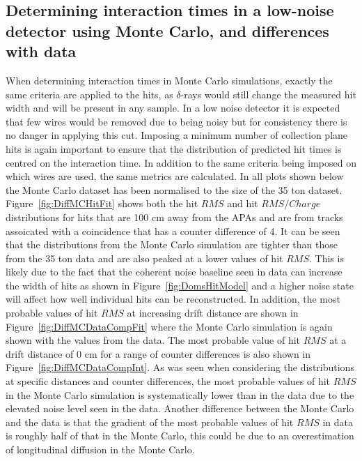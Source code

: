 \subsection{Determining interaction times in a low-noise detector using Monte Carlo, and differences with data} \label{sec:MCDataComp}
When determining interaction times in Monte Carlo simulations, exactly the same criteria are applied to the hits, as $\delta$-rays would still change the measured hit width and will be present in any sample. In a low noise detector it is expected that few wires would be removed due to being noisy but for consistency there is no danger in applying this cut. Imposing a minimum number of collection plane hits is again important to ensure that the distribution of predicted hit times is centred on the interaction time. In addition to the same criteria being imposed on which wires are used, the same metrics are calculated. In all plots shown below the Monte Carlo dataset has been normalised to the size of the 35 ton dataset. \\

Figure~\ref{fig:DiffMCHitFit} shows both the hit $RMS$ and hit $RMS/Charge$ distributions for hits that are 100 cm away from the APAs and are from tracks assoicated with a coincidence that has a counter difference of 4. It can be seen that the distributions from the Monte Carlo simulation are tighter than those from the 35 ton data and are also peaked at a lower values of hit $RMS$. This is likely due to the fact that the coherent noise baseline seen in data can increase the width of hits as shown in Figure~\ref{fig:DomsHitModel} and a higher noise state will affect how well individual hits can be reconstructed. In addition, the most probable values of hit $RMS$ at increasing drift distance are shown in Figure~\ref{fig:DiffMCDataCompFit} where the Monte Carlo simulation is again shown with the values from the data. The most probable value of hit $RMS$ at a drift distance of 0 cm for a range of counter differences is also shown in Figure~\ref{fig:DiffMCDataCompInt}. As was seen when considering the distributions at specific distances and counter differences, the most probable values of hit $RMS$ in the Monte Carlo simulation is systematically lower than in the data due to the elevated noise level seen in the data. Another difference between the Monte Carlo and the data is that the gradient of the most probable values of hit $RMS$ in data is roughly half of that in the Monte Carlo, this could be due to an overestimation of longitudinal diffusion in the Monte Carlo. \\

